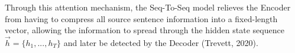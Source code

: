 Through this attention mechanism, the Seq-To-Seq model relieves the Encoder from having to compress all source sentence information into a fixed-length vector, allowing the information to spread through the hidden state sequence $\overrightarrow{h} = \Big \{ h_1,...,h_T\Big \}$ and later be detected by the Decoder (Trevett, 2020).  


%

%     
%     
%     
%     
%     
